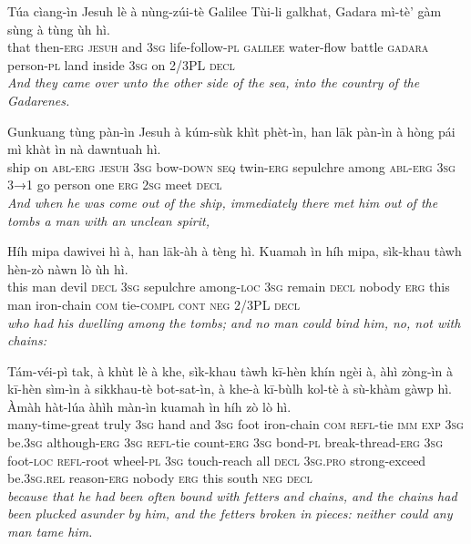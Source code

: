 \documentclass[11pt,a4paper]{article}
\begin{document}
\begin{exe}
\gll Túa cìang-ìn Jesuh lè à nùng-zúi-tè Galilee Tùi-li galkhat, Gadara mì-tè' gàm sùng à tùng ùh hì. \\
     that then-\textsc{erg} \textsc{jesuh} and \textsc{3sg} life-follow-\textsc{pl} \textsc{galilee} water-flow battle \textsc{gadara} person-\textsc{pl} land inside \textsc{3sg} on 2/3PL \textsc{decl} \\
\glt \textcolor{kjvcolor}{\textit{And they came over unto the other side of the sea, into the country of the Gadarenes.}}

\gll Gunkuang tùng pàn-ìn Jesuh à kúm-sùk khìt phèt-ìn, han lāk pàn-ìn à hòng pái mì khàt ìn nà dawntuah hì. \\
     ship on \textsc{abl}-\textsc{erg} \textsc{jesuh} \textsc{3sg} bow-\textsc{down} \textsc{seq} twin-\textsc{erg} sepulchre among \textsc{abl}-\textsc{erg} \textsc{3sg} \textsc{3→1} go person one \textsc{erg} \textsc{2sg} meet \textsc{decl} \\
\glt \textcolor{kjvcolor}{\textit{And when he was come out of the ship, immediately there met him out of the tombs a man with an unclean spirit,}}

\gll Híh mipa dawivei hì à, han lāk-àh à tèng hì. Kuamah ìn híh mipa, sìk-khau tàwh hèn-zò nàwn lò ùh hì. \\
     this man devil \textsc{decl} \textsc{3sg} sepulchre among-\textsc{loc} \textsc{3sg} remain \textsc{decl} nobody \textsc{erg} this man iron-chain \textsc{com} tie-\textsc{compl} \textsc{cont} \textsc{neg} 2/3PL \textsc{decl} \\
\glt \textcolor{kjvcolor}{\textit{who had his dwelling among the tombs; and no man could bind him, no, not with chains:}}

\gll Tám-véi-pì tak, à khùt lè à khe, sìk-khau tàwh kī-hèn khín ngèi à, àhì zòng-ìn à kī-hèn sìm-ìn à sikkhau-tè bot-sat-ìn, à khe-à kī-bùlh kol-tè à sù-khàm gàwp hì. Àmàh hàt-lúa àhìh màn-ìn kuamah ìn híh zò lò hì. \\
     many-time-great truly \textsc{3sg} hand and \textsc{3sg} foot iron-chain \textsc{com} \textsc{refl}-tie \textsc{imm} \textsc{exp} \textsc{3sg} be.\textsc{3sg} although-\textsc{erg} \textsc{3sg} \textsc{refl}-tie count-\textsc{erg} \textsc{3sg} bond-\textsc{pl} break-thread-\textsc{erg} \textsc{3sg} foot-\textsc{loc} \textsc{refl}-root wheel-\textsc{pl} \textsc{3sg} touch-reach all \textsc{decl} \textsc{3sg}.\textsc{pro} strong-exceed be.\textsc{3sg}.\textsc{rel} reason-\textsc{erg} nobody \textsc{erg} this south \textsc{neg} \textsc{decl} \\
\glt \textcolor{kjvcolor}{\textit{because that he had been often bound with fetters and chains, and the chains had been plucked asunder by him, and the fetters broken in pieces: neither could any man tame him.}}


\end{exe}
\end{document}
